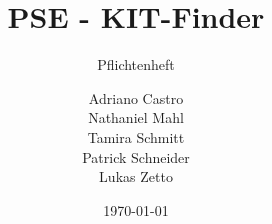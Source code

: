 \title{
    PSE - KIT-Finder
}
\subtitle{Pflichtenheft}
\author{
    Adriano Castro \\
    Nathaniel Mahl \\
    Tamira Schmitt \\
    Patrick Schneider \\
    Lukas Zetto
}

\date{\today}

\maketitle